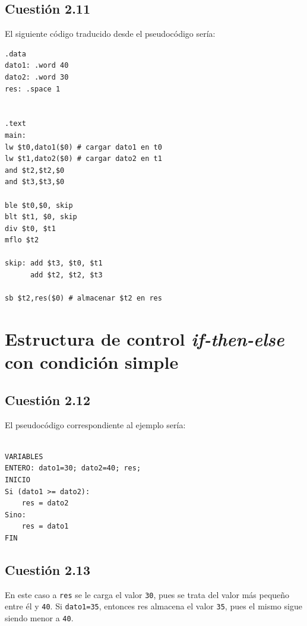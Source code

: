 \documentclass[11pt]{article}
\begin{document}
\begin{large}
\begin{flushleft}
\subsection*{Cuestión 2.11}
El siguiente código traducido desde el pseudocódigo sería:
\begin{listing}[h]
\begin{verbatim}
.data
dato1: .word 40
dato2: .word 30
res: .space 1


.text
main: 
lw $t0,dato1($0) # cargar dato1 en t0
lw $t1,dato2($0) # cargar dato2 en t1
and $t2,$t2,$0
and $t3,$t3,$0

ble $t0,$0, skip
blt $t1, $0, skip
div $t0, $t1
mflo $t2

skip: add $t3, $t0, $t1
      add $t2, $t2, $t3

sb $t2,res($0) # almacenar $t2 en res

\end{verbatim}
\end{listing}

\newpage

\section*{Estructura de control \textit{if-then-else} con condición simple}

\subsection*{Cuestión 2.12}
El pseudocódigo correspondiente al ejemplo sería:

\begin{listing}[h]
\begin{verbatim}

VARIABLES
ENTERO: dato1=30; dato2=40; res;
INICIO
Si (dato1 >= dato2):
    res = dato2
Sino:
    res = dato1
FIN
\end{verbatim}
\end{listing}

\subsection*{Cuestión 2.13}
En este caso a \texttt{res} se le carga el valor \texttt{30}, pues se trata del valor más pequeño entre él y \texttt{40}. Si \texttt{dato1=35}, entonces res almacena el valor \texttt{35}, pues el mismo sigue siendo menor a \texttt{40}.


\end{flushleft}
\end{large}
\end{document}
